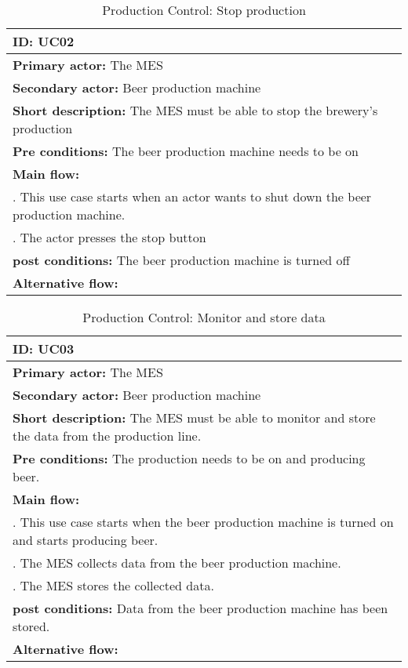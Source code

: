 \begin{table}[ht]
    \begin{tabularx}{\textwidth}{|>{\RaggedRight}X|}
        \hline
        \textbf{ID:} UC02  \\
        \hline
        \textbf{Primary actor:} The MES \\
        \hline
        \textbf{Secondary actor:} Beer production machine \\
        \hline
        \textbf{Short description:} The MES must be able to stop the brewery's
        production \\
        \hline
        \textbf{Pre conditions:} The beer production machine needs to be on \\
        \hline
        \textbf{Main flow:} \\
        	1. This use case starts when an actor wants to shut down the beer
        	production machine. \\
			2. The actor presses the stop button \\
		\hline
        \textbf{post conditions:} The beer production machine is turned off \\
        \hline
        \textbf{Alternative flow:} \\
        \hline
    \end{tabularx}
    \caption{Production Control: Stop production} 
    \label{table:usecase_productionStop}
\end{table}

\begin{table}[ht]
    \begin{tabularx}{\textwidth}{|>{\RaggedRight}X|}
        \hline
        \textbf{ID:} UC03  \\
        \hline
        \textbf{Primary actor:} The MES \\
        \hline
        \textbf{Secondary actor:} Beer production machine \\
        \hline
        \textbf{Short description:} The MES must be able to monitor and store
        the data from the production line. \\
        \hline
        \textbf{Pre conditions:} The production needs to be on and producing
        beer. \\
        \hline
        \textbf{Main flow:} \\
        	1. This use case starts when the beer production machine is turned
        	on and starts producing beer. \\
			2. The MES collects data from the beer production machine. \\
			3. The MES stores the collected data. \\
		\hline
        \textbf{post conditions:} Data from the beer production machine has been
        stored. \\
        \hline
        \textbf{Alternative flow:} \\
        \hline
    \end{tabularx}
    \caption{Production Control: Monitor and store data} 
    \label{table:usecase_productionStoreData}
\end{table}

